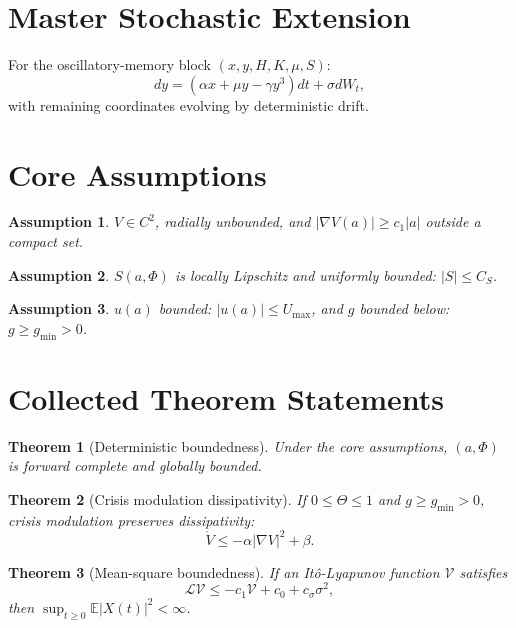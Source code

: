 ﻿\documentclass[12pt,a4paper]{article}
\newtheorem{theorem}{Theorem}
\newtheorem{assumption}{Assumption}
\begin{document}
\section{Master Stochastic Extension}
For the oscillatory-memory block $(x,y,H,K,\mu,S)$:
\begin{equation}
dy=(\alpha x+\mu y-\gamma y^3)dt+\sigma dW_t,
\end{equation}
with remaining coordinates evolving by deterministic drift.

\section{Core Assumptions}
\begin{assumption}
$V\in C^2$, radially unbounded, and $|\nabla V(a)|\ge c_1|a|$ outside a compact set.
\end{assumption}
\begin{assumption}
$S(a,\Phi)$ is locally Lipschitz and uniformly bounded: $|S|\le C_S$.
\end{assumption}
\begin{assumption}
$u(a)$ bounded: $|u(a)|\le U_{\max}$, and $g$ bounded below: $g\ge g_{\min}>0$.
\end{assumption}

\section{Collected Theorem Statements}
\begin{theorem}[Deterministic boundedness]
Under the core assumptions, $(a,\Phi)$ is forward complete and globally bounded.
\end{theorem}

\begin{theorem}[Crisis modulation dissipativity]
If $0\le\Theta\le1$ and $g\ge g_{\min}>0$, crisis modulation preserves dissipativity:
\begin{equation}
\dot V\le -\alpha|\nabla V|^2+\beta.
\end{equation}
\end{theorem}

\begin{theorem}[Mean-square boundedness]
If an It\^o-Lyapunov function $\mathcal V$ satisfies
\begin{equation}
\mathcal L\mathcal V\le -c_1\mathcal V+c_0+c_\sigma\sigma^2,
\end{equation}
then $\sup_{t\ge0}\mathbb E|X(t)|^2<\infty$.
\end{theorem}
\end{document}
